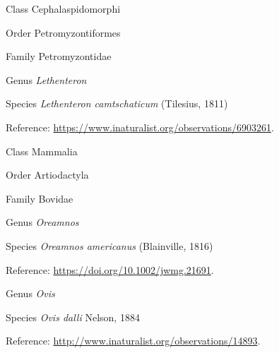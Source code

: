 \documentclass[9pt, article]{memoir}
\begin{document}
\begin{multicols}{2}
\vspace{6pt}\noindent\hspace{12pt}Class Cephalaspidomorphi


\vspace{6pt}\noindent\hspace{18pt}Order Petromyzontiformes


\vspace{6pt}\noindent\hspace{24pt}Family Petromyzontidae


\vspace{6pt}\noindent\hspace{30pt}Genus \textit{Lethenteron}


\vspace{6pt}\noindent\hspace{36pt}Species \textit{Lethenteron camtschaticum} (Tilesius, 1811)


\vspace{6pt}Reference: 
\url{https://www.inaturalist.org/observations/6903261}.

\vspace{6pt}\noindent\hspace{12pt}Class Mammalia


\vspace{6pt}\noindent\hspace{18pt}Order Artiodactyla


\vspace{6pt}\noindent\hspace{24pt}Family Bovidae


\vspace{6pt}\noindent\hspace{30pt}Genus \textit{Oreamnos}


\vspace{6pt}\noindent\hspace{36pt}Species \textit{Oreamnos americanus} (Blainville, 1816)


\vspace{6pt}Reference: 
\url{https://doi.org/10.1002/jwmg.21691}.

\vspace{6pt}\noindent\hspace{30pt}Genus \textit{Ovis}


\vspace{6pt}\noindent\hspace{36pt}Species \textit{Ovis dalli} Nelson, 1884


\vspace{6pt}Reference: 
\url{http://www.inaturalist.org/observations/14893}.


\end{multicols}
\end{document}

